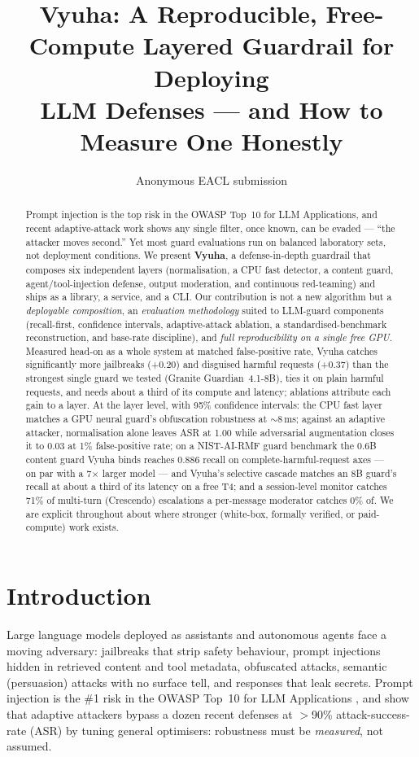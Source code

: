 \documentclass[11pt]{article}
\title{Vyuha: A Reproducible, Free-Compute Layered Guardrail for Deploying\\
LLM Defenses --- and How to Measure One Honestly}
\author{Anonymous EACL submission}
\begin{document}
\maketitle

\begin{abstract}
Prompt injection is the top risk in the OWASP Top~10 for LLM Applications, and recent
adaptive-attack work shows any single filter, once known, can be evaded --- ``the attacker moves
second.'' Yet most guard evaluations run on balanced laboratory sets, not deployment conditions.
We present \textbf{Vyuha}, a defense-in-depth guardrail that composes six independent layers
(normalisation, a CPU fast detector, a content guard, agent/tool-injection defense, output
moderation, and continuous red-teaming) and ships as a library, a service, and a CLI. Our
contribution is not a new algorithm but a \emph{deployable composition}, an
\emph{evaluation methodology} suited to LLM-guard components (recall-first, confidence intervals,
adaptive-attack ablation, a standardised-benchmark reconstruction, and base-rate discipline), and
\emph{full reproducibility on a single free GPU}. Measured head-on as a whole system at matched false-positive rate, Vyuha catches significantly
more jailbreaks (+0.20) and disguised harmful requests (+0.37) than the strongest single guard we tested
(Granite Guardian~4.1-8B), ties it on plain harmful requests, and needs about a third of its compute and
latency; ablations attribute each gain to a layer. At the layer level, with 95\%
confidence intervals: the CPU fast layer matches a GPU neural guard's obfuscation robustness at
$\sim$8\,ms; against an adaptive attacker, normalisation alone leaves ASR at 1.00 while adversarial
augmentation closes it to 0.03 at 1\% false-positive rate; on a NIST-AI-RMF guard benchmark the
0.6B content guard Vyuha binds reaches 0.886 recall on complete-harmful-request axes --- on par with a
7$\times$ larger model --- and Vyuha's selective cascade matches an 8B guard's recall at about a third
of its latency on a free T4; and a session-level monitor catches 71\% of multi-turn (Crescendo) escalations a
per-message moderator catches 0\% of. We are explicit throughout about where stronger
(white-box, formally verified, or paid-compute) work exists.
\end{abstract}

\section{Introduction}
Large language models deployed as assistants and autonomous agents face a moving adversary:
jailbreaks that strip safety behaviour, prompt injections hidden in retrieved content and tool
metadata, obfuscated attacks, semantic (persuasion) attacks with no surface tell,
and responses that leak secrets. Prompt injection is the \#1 risk in the OWASP Top~10 for LLM
Applications \citep{owasp-llm}, and \citet{attacker-second} show that adaptive attackers bypass a
dozen recent defenses at $>$90\% attack-success-rate (ASR) by tuning general optimisers: robustness
must be \emph{measured}, not assumed.
\end{document}
